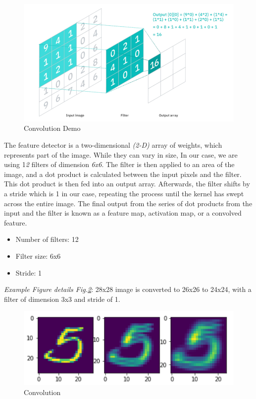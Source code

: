\documentclass[conference]{IEEEtran}
\begin{document}
\begin{figure}[h]
  \centering
  \includegraphics[scale=0.3]{images/conv_demo.png}
  \caption{Convolution Demo\cite{Conv_layer_2020}}
  \label{fig:Conv_demo}
\end{figure}


The feature detector is a two-dimensional \emph{(2-D)} array of weights, which represents part of the image. While they can vary in size, In our case, we are using 1\emph{2} filters of dimension \emph{6x6}. The filter is then applied to an area of the image, and a dot product is calculated between the input pixels and the filter. This dot product is then fed into an output array. Afterwards, the filter shifts by a stride which is 1 in our case, repeating the process until the kernel has swept across the entire image. The final output from the series of dot products from the input and the filter is known as a feature map, activation map, or a convolved feature.

\begin{itemize}
    \item Number of filters: 12
    \item Filter size: 6x6
    \item Stride: 1
\end{itemize}



\emph{Example Figure details Fig.\ref{fig:Convolution}}: 28x28 image is converted to 26x26 to 24x24, with a filter of dimension 3x3 and stride of 1.
\begin{figure}[h]
  \centering
  \includegraphics[scale=0.4]{images/conv.png}
  \caption{Convolution\cite{MNIST}}
  \label{fig:Convolution}
\end{figure}
\end{document}
